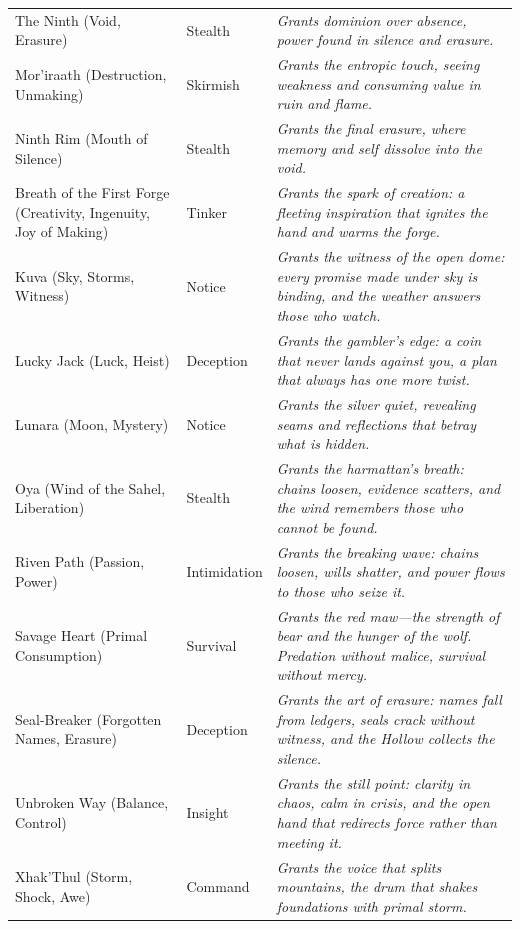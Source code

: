 \begin{longtable}{@{}p{4.2cm}p{3.2cm}p{7.2cm}@{}}
  The Ninth (Void, Erasure) & Stealth &
  \emph{Grants dominion over absence, power found in silence and erasure.} \\
  
  Mor'iraath (Destruction, Unmaking) & Skirmish &
  \emph{Grants the entropic touch, seeing weakness and consuming value in ruin and flame.} \\
  
  Ninth Rim (Mouth of Silence) & Stealth &
  \emph{Grants the final erasure, where memory and self dissolve into the void.} \\

  Breath of the First Forge (Creativity, Ingenuity, Joy of Making) & Tinker &
  \emph{Grants the spark of creation: a fleeting inspiration that ignites the hand and warms the forge.} \\

  Kuva (Sky, Storms, Witness) & Notice &
  \emph{Grants the witness of the open dome: every promise made under sky is binding, and the weather answers those who watch.} \\
  
  Lucky Jack (Luck, Heist) & Deception &
  \emph{Grants the gambler's edge: a coin that never lands against you, a plan that always has one more twist.} \\
  
  Lunara (Moon, Mystery) & Notice &
  \emph{Grants the silver quiet, revealing seams and reflections that betray what is hidden.} \\
  
  Oya (Wind of the Sahel, Liberation) & Stealth &
  \emph{Grants the harmattan's breath: chains loosen, evidence scatters, and the wind remembers those who cannot be found.} \\
  
  Riven Path (Passion, Power) & Intimidation &
  \emph{Grants the breaking wave: chains loosen, wills shatter, and power flows to those who seize it.} \\
  
  Savage Heart (Primal Consumption) & Survival &
  \emph{Grants the red maw---the strength of bear and the hunger of the wolf. Predation without malice, survival without mercy.} \\
  
  Seal-Breaker (Forgotten Names, Erasure) & Deception &
  \emph{Grants the art of erasure: names fall from ledgers, seals crack without witness, and the Hollow collects the silence.} \\
  
  Unbroken Way (Balance, Control) & Insight &
  \emph{Grants the still point: clarity in chaos, calm in crisis, and the open hand that redirects force rather than meeting it.} \\
  
  Xhak'Thul (Storm, Shock, Awe) & Command &
  \emph{Grants the voice that splits mountains, the drum that shakes foundations with primal storm.} \\
\end{longtable}

